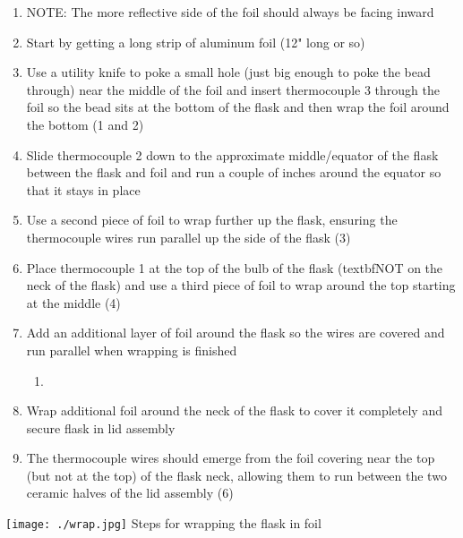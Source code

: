 \begin{enumerate}
\item
  NOTE: The more reflective side of the foil should always be facing
  inward
\item
  Start by getting a long strip of aluminum foil (12" long or so)
\item
  Use a utility knife to poke a small hole (just big enough to poke the
  bead through) near the middle of the foil and insert thermocouple 3
  through the foil so the bead sits at the bottom of the flask and then
  wrap the foil around the bottom (1 and 2)
\item
  Slide thermocouple 2 down to the approximate middle/equator of the
  flask between the flask and foil and run a couple of inches around the
  equator so that it stays in place\\
\item
  Use a second piece of foil to wrap further up the flask, ensuring the
  thermocouple wires run parallel up the side of the flask (3)
\item
  Place thermocouple 1 at the top of the bulb of the flask (textbfNOT on
  the neck of the flask) and use a third piece of foil to wrap around
  the top starting at the middle (4)
\item
  Add an additional layer of foil around the flask so the wires are
  covered and run parallel when wrapping is finished

  \begin{enumerate}
  \def\labelenumii{(\arabic{enumii})}
  \setcounter{enumii}{4}
  \tightlist
  \item
  \end{enumerate}
\item
  Wrap additional foil around the neck of the flask to cover it
  completely and secure flask in lid assembly
\item
  The thermocouple wires should emerge from the foil covering near the
  top (but not at the top) of the flask neck, allowing them to run
  between the two ceramic halves of the lid assembly (6)
\end{enumerate}

\texttt{[image: ./wrap.jpg]} Steps for wrapping the flask in foil
